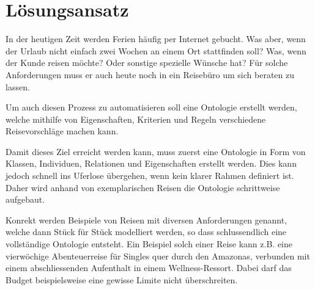 \chapter{Lösungsansatz}
\label{chap:loesungsansatz}

In der heutigen Zeit werden Ferien häufig per Internet gebucht. Was aber, wenn der Urlaub nicht einfach zwei Wochen an einem Ort stattfinden soll? Was, wenn der Kunde reisen möchte? Oder sonstige spezielle Wünsche hat? Für solche Anforderungen muss er auch heute noch in ein Reisebüro um sich beraten zu lassen.

Um auch diesen Prozess zu automatisieren soll eine Ontologie erstellt werden, welche mithilfe von Eigenschaften, Kriterien und Regeln verschiedene Reisevorschläge machen kann.

Damit dieses Ziel erreicht werden kann, muss zuerst eine Ontologie in Form von Klassen, Individuen, Relationen und Eigenschaften erstellt werden. Dies kann jedoch schnell ins Uferlose übergehen, wenn kein klarer Rahmen definiert ist. Daher wird anhand von exemplarischen Reisen die Ontologie schrittweise aufgebaut.

Konrekt werden Beispiele von Reisen mit diversen Anforderungen genannt, welche dann Stück für Stück modelliert werden, so dass schlussendlich eine vollständige Ontologie entsteht. Ein Beispiel solch einer Reise kann z.B. eine vierwöchige Abenteuerreise für Singles quer durch den Amazonas, verbunden mit einem abschliessenden Aufenthalt in einem Wellness-Ressort. Dabei darf das Budget beispielsweise eine gewisse Limite nicht überschreiten.
